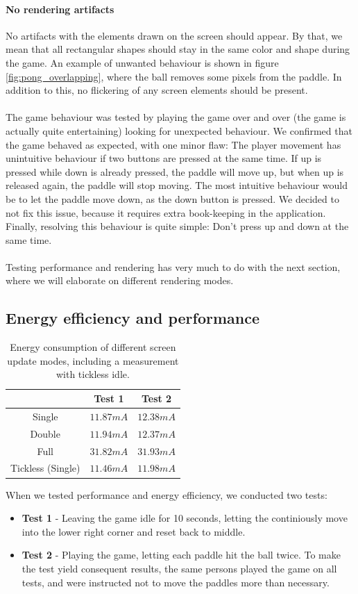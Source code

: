 \paragraph{No rendering artifacts}
No artifacts with the elements drawn on the screen should appear. By that, we mean that all rectangular shapes should stay in the same color and shape during the game. An example of unwanted behaviour is shown in figure \ref{fig:pong_overlapping}, where the ball removes some pixels from the paddle. In addition to this, no flickering of any screen elements should be present. \\
\\
The game behaviour was tested by playing the game over and over (the game is actually quite entertaining) looking for unexpected behaviour. We confirmed that the game behaved as expected, with one minor flaw: The player movement has unintuitive behaviour if two buttons are pressed at the same time. If up is pressed while down is already pressed, the paddle will move up, but when up is released again, the paddle will stop moving. The most intuitive behaviour would be to let the paddle move down, as the down button is pressed. We decided to not fix this issue, because it requires extra book-keeping in the application. Finally, resolving this behaviour is quite simple: Don't press up and down at the same time.\\
\\
Testing performance and rendering has very much to do with the next section, where we will elaborate on different rendering modes.

\subsection{Energy efficiency and performance}
\begin{table}
	\label{table:energy_consumption}
	\centering
	\begin{tabular}{c|c|c}
		\hline
		\hline
		& Test 1 & Test 2\\
		\hline
		Single & $11.87mA$ & $12.38mA$ \\
		Double & $11.94mA$ & $12.37mA$ \\
		Full & $31.82mA$ & $31.93mA$ \\
		\hline
		Tickless (Single) & $11.46mA$ & $11.98mA$ \\
		\hline
		
	
	\end{tabular}
	\caption{Energy consumption of different screen update modes, including a measurement with tickless idle.}
\end{table}
When we tested performance and energy efficiency, we conducted two tests:
\begin{itemize}
	\item \textbf{Test 1}  - Leaving the game idle for 10 seconds, letting the continiously move into the lower right corner and reset back to middle.
	\item \textbf{Test 2} - Playing the game, letting each paddle hit the ball twice. To make the test yield consequent results, the same persons played the game on all tests, and were instructed not to move the paddles more than necessary.
\end{itemize}

